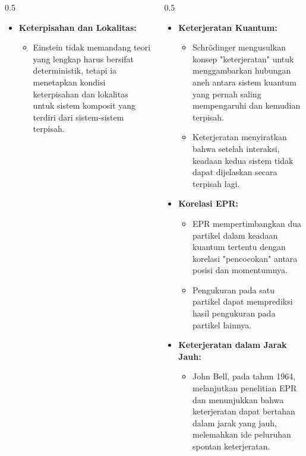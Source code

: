 \begin{frame}
\begin{columns}
\begin{column}{0.5\textwidth}
\begin{itemize}
                \item \textbf{Keterpisahan dan Lokalitas:}
                    \begin{itemize} \justifying \tiny 
                        \item Einstein tidak memandang teori yang lengkap harus bersifat deterministik, tetapi ia menetapkan kondisi keterpisahan dan lokalitas untuk sistem komposit yang terdiri dari sistem-sistem terpisah.
                    \end{itemize}
            \end{itemize} 
        \end{column}
        
            \begin{column}{0.5\textwidth} %
            \justifying %
            \tiny %
            \vspace{-0.5 cm}
                \begin{itemize}
                \item \textbf{Keterjeratan Kuantum:}
                    \begin{itemize} \justifying \tiny 
                        \item Schrödinger mengusulkan konsep "keterjeratan" untuk menggambarkan hubungan aneh antara sistem kuantum yang pernah saling mempengaruhi dan kemudian terpisah.
                        \item Keterjeratan menyiratkan bahwa setelah interaksi, keadaan kedua sistem tidak dapat dijelaskan secara terpisah lagi.
                    \end{itemize}
                
                \item \textbf{Korelasi EPR:}
                    \begin{itemize} \justifying \tiny 
                        \item EPR mempertimbangkan dua partikel dalam keadaan kuantum tertentu dengan korelasi "pencocokan" antara posisi dan momentumnya.
                        \item Pengukuran pada satu partikel dapat memprediksi hasil pengukuran pada partikel lainnya.
                    \end{itemize}
                
                \item \textbf{Keterjeratan dalam Jarak Jauh:}
                    \begin{itemize} \justifying \tiny 
                        \item John Bell, pada tahun 1964, melanjutkan penelitian EPR dan menunjukkan bahwa keterjeratan dapat bertahan dalam jarak yang jauh, melemahkan ide peluruhan spontan keterjeratan.
                    \end{itemize}
                

\end{itemize}
\end{column}
\end{columns}
\end{frame}
